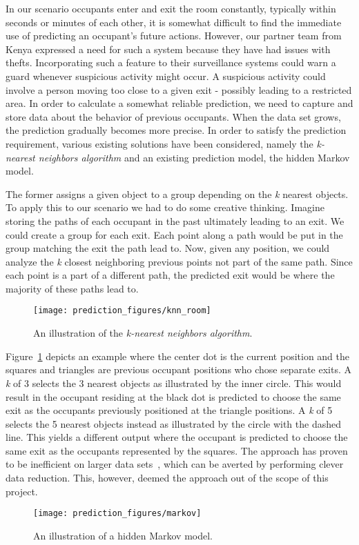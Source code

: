 In our scenario occupants enter and exit the room constantly, typically within seconds or minutes of each other, it is somewhat difficult to find the immediate use of predicting an occupant's future actions. However, our partner team from Kenya expressed a need for such a system because they have had issues with thefts. Incorporating such a feature to their surveillance systems could warn a guard whenever suspicious activity might occur. A suspicious activity could involve a person moving too close to a given exit - possibly leading to a restricted area. In order to calculate a somewhat reliable prediction, we need to capture and store data about the behavior of previous occupants. When the data set grows, the prediction gradually becomes more precise. In order to satisfy the prediction requirement, various existing solutions have been considered, namely the \emph{k-nearest neighbors algorithm} and an existing prediction model, the hidden Markov model.

The former assigns a given object to a group depending on the \emph{k} nearest objects. To apply this to our scenario we had to do some creative thinking. Imagine storing the paths of each occupant in the past ultimately leading to an exit. We could create a group for each exit. Each point along a path would be put in the group matching the exit the path lead to. Now, given any position, we could analyze the \emph{k} closest neighboring previous points not part of the same path. Since each point is a part of a different path, the predicted exit would be where the majority of these paths lead to.
\begin{figure}[htb]
\centering
\texttt{[image: prediction\_figures/knn\_room]}
\caption{An illustration of the \emph{k-nearest neighbors algorithm}.}
\label{fig:knn}
\end{figure}
Figure~\ref{fig:knn} depicts an example where the center dot is the current position and the squares and triangles are previous occupant positions who chose separate exits. A \emph{k} of 3 selects the 3 nearest objects as illustrated by the inner circle. This would result in the occupant residing at the black dot is predicted to choose the same exit as the occupants previously positioned at the triangle positions. A \emph{k} of 5 selects the 5 nearest objects instead as illustrated by the circle with the dashed line. This yields a different output where the occupant is predicted to choose the same exit as the occupants represented by the squares. The approach has proven to be inefficient on larger data sets~\cite{bhatia}, which can be averted by performing clever data reduction. This, however, deemed the approach out of the scope of this project.
\begin{figure}[htb]
\centering
\texttt{[image: prediction\_figures/markov]}
\caption{An illustration of a hidden Markov model.}
\label{fig:markov}
\end{figure}

